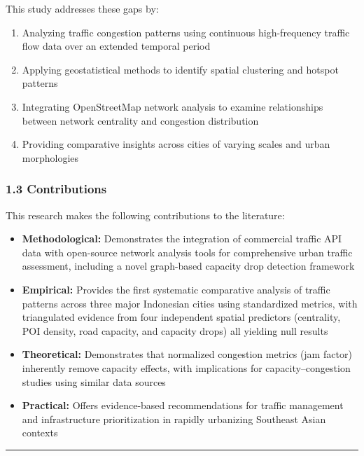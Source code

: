 \documentclass[
  12pt,
]{article}
\providecommand{\tightlist}{%
  \setlength{\itemsep}{0pt}\setlength{\parskip}{0pt}}
\begin{document}
This study addresses these gaps by:

\begin{enumerate}
\def\labelenumi{\arabic{enumi}.}
\tightlist
\item
  Analyzing traffic congestion patterns using continuous high-frequency traffic flow data over an extended temporal period
\item
  Applying geostatistical methods to identify spatial clustering and hotspot patterns
\item
  Integrating OpenStreetMap network analysis to examine relationships between network centrality and congestion distribution
\item
  Providing comparative insights across cities of varying scales and urban morphologies
\end{enumerate}

\subsubsection{1.3 Contributions}\label{contributions}

This research makes the following contributions to the literature:

\begin{itemize}
\tightlist
\item
  \textbf{Methodological:} Demonstrates the integration of commercial traffic API data with open-source network analysis tools for comprehensive urban traffic assessment, including a novel graph-based capacity drop detection framework
\item
  \textbf{Empirical:} Provides the first systematic comparative analysis of traffic patterns across three major Indonesian cities using standardized metrics, with triangulated evidence from four independent spatial predictors (centrality, POI density, road capacity, and capacity drops) all yielding null results
\item
  \textbf{Theoretical:} Demonstrates that normalized congestion metrics (jam factor) inherently remove capacity effects, with implications for capacity--congestion studies using similar data sources
\item
  \textbf{Practical:} Offers evidence-based recommendations for traffic management and infrastructure prioritization in rapidly urbanizing Southeast Asian contexts
\end{itemize}

\begin{center}\rule{0.5\linewidth}{0.5pt}\end{center}
\end{document}
